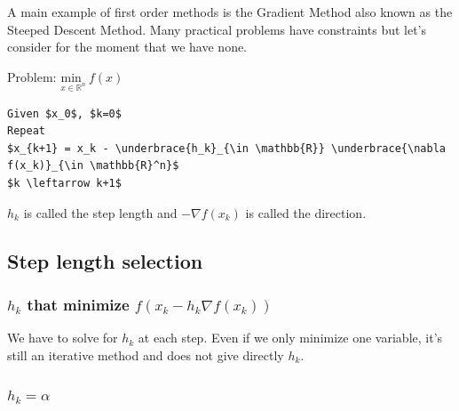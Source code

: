 A main example of first order methods is the Gradient Method also known as the Steeped Descent Method. Many practical problems have constraints but let's consider for the moment that we have none.  
 
Problem:  $\underset{x  \in \mathbb{R}^n}{\text{min }} \: f(x) $
 
\begin{lstlisting}[mathescape,caption=Gradient Algorithm]
Given $x_0$, $k=0$
Repeat
$x_{k+1} = x_k - \underbrace{h_k}_{\in \mathbb{R}} \underbrace{\nabla f(x_k)}_{\in \mathbb{R}^n}$
$k \leftarrow k+1$
\end{lstlisting}

$h_k$ is called the step length and $-\nabla f(x_k)$ is called the direction.

\subsection{Step length selection}

\subsubsection{ $h_k$ that minimize $f(x_k - h_k \nabla f(x_k))$} 

We have to solve for $h_k$ at each step. Even if we only minimize one variable, it's still an iterative method and does not give directly $h_k$. 

\subsubsection{$h_k = \alpha$}

